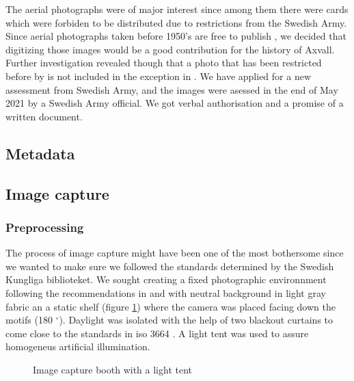 \documentclass[12 pt]{paper}
\begin{document}
The aerial photographs were of major interest since among them there were cards  which were forbiden to be distributed due to restrictions from the Swedish Army. Since aerial photographs taken before 1950's are free to publish \autocite[][kap. 3, 3§]{lantm2018}, we decided that digitizing those images would be a good contribution for the history of Axvall. Further investigation revealed though that a photo that has been restricted before by is not included in the exception in \textcite{lantm2018}. We have applied for a new assessment from Swedish Army, and the images were asessed in the end of May 2021 by a Swedish Army official. We got verbal authorisation and a promise of a written document.
\subsection{Metadata}

\subsection{Image capture}
\subsubsection{Preprocessing}
The process of image capture might have been one of the most bothersome since we wanted to make sure we followed the standards determined by the Swedish Kungliga biblioteket. We sought creating a fixed photographic environnment following the recommendations in \textcite[]{dgf1216} and \textcite[part 3]{kronlund2021p3} with neutral background in light gray fabric an a static shelf (figure \ref{baset}) where the camera was placed facing down the motifs (180 $ ^{\circ} $).  Daylight was isolated with the help of two blackout curtains to come close to the standards in iso 3664 \autocite[cf.][]{johansson2021}. A light tent was used to assure homogeneus artificial illumination.  %



\begin{figure}[!htb]
	\centering
	\caption[short:]{Image capture booth with a light tent}
	\label{baset}
\end{figure}
\end{document}
